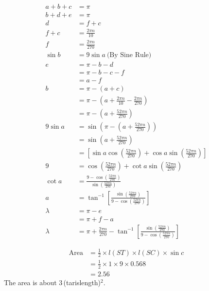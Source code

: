 \begin{description}
  \begin{align*}
  a + b + c &= \pi \tag{9}\\
  b + d + e &= \pi \tag{10}\\
  d &= f + c \tag{11}\\
  f + c &= \frac{2\pi n}{10} \tag{12}\\
  f &= \frac{2\pi n}{270} \tag{13}\\
  \sin b &= 9\sin a \ \text{(By Sine Rule)} \tag{14}\\[6pt]
  e &= \pi - b - d \tag{15}\\
    &= \pi - b - c - f \tag{16}\\
    &= a - f \tag{17}\\[6pt]
  b &= \pi - (a + c) \tag{18}\\
    &= \pi - \left(a + \frac{2\pi n}{10} - \frac{2\pi n}{270}\right) \tag{19}\\
    &= \pi - \left(a + \frac{52\pi n}{270}\right) \tag{20}\\[6pt]
  9\sin a &= \sin\left(\pi - \left(a + \frac{52\pi n}{270}\right)\right)
    \tag{21}\\
    &= \sin\left(a + \frac{52\pi n}{270}\right) \tag{22}\\
    &= \left[\sin a\cos\left(\frac{52\pi n}{270}\right)
       + \cos a\sin\left(\frac{52\pi n}{270}\right)\right] \tag{23}\\
  9 &= \cos\left(\frac{52\pi n}{270}\right)
       + \cot a\sin\left(\frac{52\pi n}{270}\right) \tag{24}\\
  \cot a &= \frac{9 - \cos\left(\frac{52\pi n}{270}\right)}
                 {\sin\left(\frac{52\pi n}{270}\right)} \tag{25}\\
  a &= \tan^{-1}\!\left[\frac{\sin\left(\frac{52\pi n}{270}\right)}
       {9 - \cos\left(\frac{52\pi n}{270}\right)}\right] \tag{26}\\[6pt]
  \lambda &= \pi - e \tag{27}\\
          &= \pi + f - a \tag{28}\\
  \lambda &= \pi + \frac{2\pi n}{270}
     - \tan^{-1}\!\left[\frac{\sin\left(\frac{52\pi n}{270}\right)}
       {9 - \cos\left(\frac{52\pi n}{270}\right)}\right] \tag{29}
  \end{align*}
\item[(g)]
  \begin{align*}
  \text{Area} &= \frac12 \times l(ST) \times l(SC) \times \sin c\\
              &= \frac12 \times 1 \times 9 \times 0.568\\
              &= 2.56
  \end{align*}
  The area is about 3\,(tarislength)$^2$.
\end{description}
